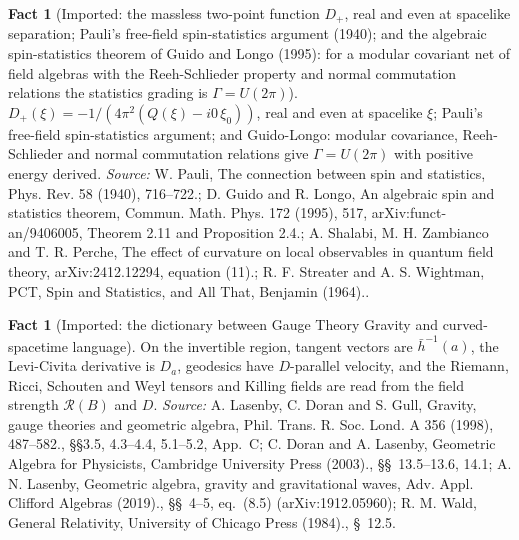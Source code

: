\documentclass[11pt]{article}
\theoremstyle{definition}
\newtheorem{fact}[theorem]{Fact}
\theoremstyle{plain}
\providecommand{\hb}{}\renewcommand{\hb}{\bar{h}}
\begin{document}
\begin{fact}[Imported: the massless two-point function $D_{+}$, real and even at spacelike separation; Pauli's free-field spin-statistics argument (1940); and the algebraic spin-statistics theorem of Guido and Longo (1995): for a modular covariant net of field algebras with the Reeh-Schlieder property and normal commutation relations the statistics grading is $\Gamma = U(2\pi)$]\label{c:synthesis.imported-free-field-spin-statistics-and-guido-longo-theorem}
$D_{+}(\xi) = -1/(4\pi^{2}(Q(\xi) - i0\,\xi_{0}))$, real and even at spacelike $\xi$; Pauli's free-field spin-statistics argument; and Guido-Longo: modular covariance, Reeh-Schlieder and normal commutation relations give $\Gamma = U(2\pi)$ with positive energy derived.
\emph{Source:} W. Pauli, The connection between spin and statistics, Phys. Rev. 58 (1940), 716--722.; D. Guido and R. Longo, An algebraic spin and statistics theorem, Commun. Math. Phys. 172 (1995), 517, arXiv:funct-an/9406005, Theorem 2.11 and Proposition 2.4.; A. Shalabi, M. H. Zambianco and T. R. Perche, The effect of curvature on local observables in quantum field theory, arXiv:2412.12294, equation (11).; R. F. Streater and A. S. Wightman, PCT, Spin and Statistics, and All That, Benjamin (1964)..
\end{fact}

\begin{fact}[Imported: the dictionary between Gauge Theory Gravity and curved-spacetime language]\label{c:synthesis.imported-gtg-dictionary}
On the invertible region, tangent vectors are $\hb^{-1}(a)$, the Levi-Civita derivative is $D_a$, geodesics have $D$-parallel velocity, and the Riemann, Ricci, Schouten and Weyl tensors and Killing fields are read from the field strength $\mathcal{R}(B)$ and $D$.
\emph{Source:} A. Lasenby, C. Doran and S. Gull, Gravity, gauge theories and geometric algebra, Phil. Trans. R. Soc. Lond. A 356 (1998), 487--582., \S\S 3.5, 4.3--4.4, 5.1--5.2, App.~C; C. Doran and A. Lasenby, Geometric Algebra for Physicists, Cambridge University Press (2003)., \S\S~13.5--13.6, 14.1; A. N. Lasenby, Geometric algebra, gravity and gravitational waves, Adv. Appl. Clifford Algebras (2019)., \S\S~4--5, eq.~(8.5) (arXiv:1912.05960); R. M. Wald, General Relativity, University of Chicago Press (1984)., \S~12.5.
\end{fact}
\end{document}
